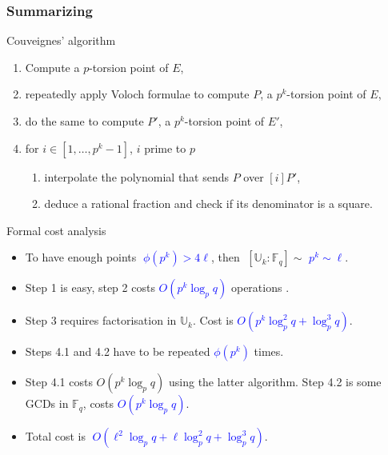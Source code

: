 \documentclass[10pt]{beamer}
\newcommand{\blue}[1]{\textcolor{blue}{#1}}  %
\newcommand{\U}{\mathbb{U}}  %
\newcommand{\F}{\mathbb{F}}  %
\newcommand{\euler}{\phi}  %
\newcommand{\0}{\mathcal{O}}  %
\begin{document}

\begin{frame}
  \frametitle{Summarizing}

  \vspace{-2mm}

  \begin{block}{Couveignes' algorithm}
    \begin{enumerate}
    \item Compute a $p$-torsion point of $E$,
    \item repeatedly apply Voloch formulae to compute $P$, a $p^k$-torsion
      point of $E$,
    \item do the same to compute $P'$, a $p^k$-torsion point
      of $E'$,
    \item for $i \in [1,\dots,p^k-1]$, $i$ prime to $p$
      \begin{enumerate}
      \item interpolate the polynomial that sends $P$ over $[i]P'$,
      \item deduce a rational fraction and check if its denominator is
        a square.
      \end{enumerate}
    \end{enumerate}
  \end{block}

  \vspace{-2mm}

  \begin{block}{Formal cost analysis}
    \begin{itemize}
    \item To have enough points \blue{$\;\euler(p^k) > 4\ell$}, then
      $\;[\U_k:\F_q] \sim$ \blue{$p^k \sim \ell$}.
    \item Step 1 is easy, step 2 costs \blue{$O(p^k\log_pq)$}
      operations .
    \item Step 3 requires factorisation in $\U_k$. Cost is
      \blue{$O(p^{k}\log_p^2q + \log_p^3q)$}.
    \item Steps 4.1 and 4.2 have to be repeated
      \blue{$\euler(p^k)$} times.
    \item Step 4.1 costs \alert{$O(p^k\log_pq)$} using the latter
      algorithm. Step 4.2 is some GCDs in $\F_q$, costs
      \blue{$O(p^k\log_pq)$}.
    \item Total cost is \blue{$\;O(\ell^2\log_pq + \ell\log_p^2q + \log_p^3q)$}.
    \end{itemize}
  \end{block}
\end{frame}
\end{document}
